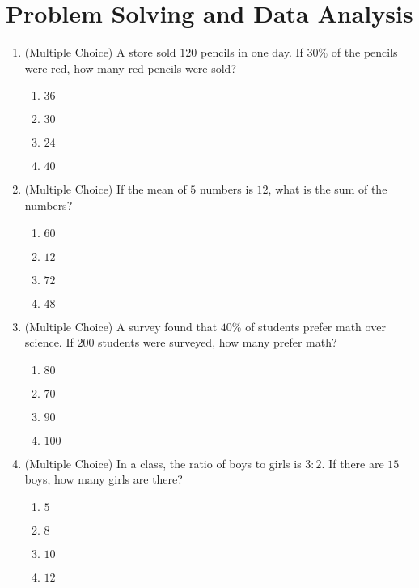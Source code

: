 \documentclass[12pt]{article}
\begin{document}
\newpage

\section{Problem Solving and Data Analysis}
\begin{enumerate}[label=\textbf{Question \arabic*:}]
  \item (Multiple Choice) A store sold \(120\) pencils in one day. If \(30\%\) of the pencils were red, how many red pencils were sold?
    \begin{enumerate}[label=(\Alph*)]
      \item \(36\)
      \item \(30\)
      \item \(24\)
      \item \(40\)
    \end{enumerate}
    
  \item (Multiple Choice) If the mean of \(5\) numbers is \(12\), what is the sum of the numbers?
    \begin{enumerate}[label=(\Alph*)]
      \item \(60\)
      \item \(12\)
      \item \(72\)
      \item \(48\)
    \end{enumerate}
    
  \item (Multiple Choice) A survey found that \(40\%\) of students prefer math over science. If \(200\) students were surveyed, how many prefer math?
    \begin{enumerate}[label=(\Alph*)]
      \item \(80\)
      \item \(70\)
      \item \(90\)
      \item \(100\)
    \end{enumerate}
    
  \item (Multiple Choice) In a class, the ratio of boys to girls is \(3:2\). If there are \(15\) boys, how many girls are there?
    \begin{enumerate}[label=(\Alph*)]
      \item \(5\)
      \item \(8\)
      \item \(10\)
      \item \(12\)
    \end{enumerate}
    

\end{enumerate}
\end{document}
